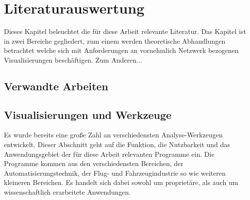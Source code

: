 \documentclass[draft=false
              ,paper=a4
              ,twoside=false
              ,fontsize=11pt
              ,headsepline
              ,BCOR10mm
              ,DIV11
              ]{scrbook}
\newcommand{\TODO}[1]{\colorbox{yellow}{\textcolor{red}{[TODO: #1]}}}
\begin{document}

\chapter{Literaturauswertung} %
\label{cha:literaturauswertung}

Dieses Kapitel beleuchtet die für diese Arbeit relevante Literatur. Das Kapitel ist in zwei Bereiche gegliedert, zum einem werden theoretische Abhandlungen betrachtet welche sich mit Anforderungen an vornehmlich Netzwerk bezogenen Visualisierungen beschäftigen. Zum Anderen...

\section{Verwandte Arbeiten} %
\label{sec:verwandte_arbeiten}

\section{Visualisierungen und Werkzeuge} %
\label{sec:anwendungen_und_werkzeuge}
Es wurde bereits eine große Zahl an verschiedensten Analyse-Werkzeugen entwickelt. Dieser Abschnitt geht auf die Funktion, die Nutzbarkeit und das Anwendungsgebiet der für diese Arbeit relevanten Programme ein. Die Programme kommen aus den verschiedensten Bereichen, der Automatisierungstechnik, der Flug- und Fahrzeugindustrie so wie weiteren kleineren Bereichen. Es handelt sich dabei sowohl um proprietäre, als auch um wissenschaftlich erarbeitete Anwendungen. 

\end{document}
